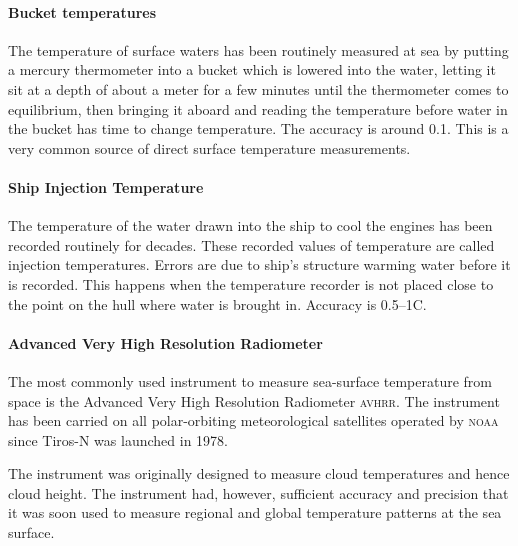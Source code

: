 \paragraph{Bucket temperatures} The temperature of surface waters has been
routinely measured at sea by putting a mercury
thermometer into a bucket which is lowered into the water, letting it
sit at a depth of about a meter for a few minutes until the
thermometer comes to equilibrium, then bringing it aboard and reading
the temperature before water in the bucket has time to change
temperature. The accuracy is around
0.1.  This is a very common source of direct surface
temperature measurements.

\paragraph{Ship Injection Temperature} The temperature of the water drawn into
the ship to cool the engines has been recorded
routinely for decades. These recorded values of temperature are called
injection temperatures. Errors are due to ship's structure warming
water before it is recorded. This happens when the temperature
recorder is not placed close to the point on the hull where water is
brought in. Accuracy is
0.5\degrees --1\degrees C.

\paragraph{Advanced Very High Resolution Radiometer} The most commonly
used instrument to measure sea-surface
temperature from space is the Advanced Very High Resolution Radiometer
\textsc{avhrr}. The instrument has been carried on all polar-orbiting
meteorological satellites operated by \textsc{noaa} since Tiros-N was
launched in 1978.

The instrument was originally designed to measure cloud temperatures
and hence cloud height. The instrument had, however, sufficient
accuracy and precision that it was
soon used to measure regional and global temperature patterns at the
sea surface.

